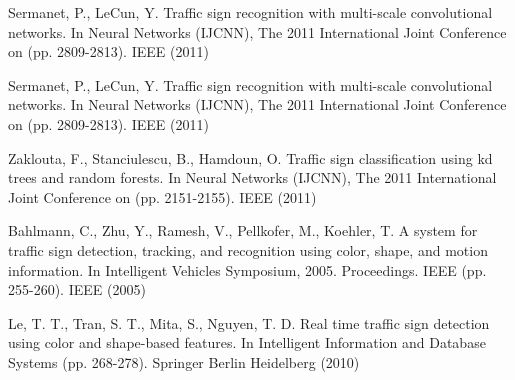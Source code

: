 \documentclass[conference]{IEEEtran}
\begin{document}
\begin{thebibliography}{1}
 Sermanet, P., LeCun, Y. Traffic sign recognition with multi-scale convolutional networks. In Neural Networks (IJCNN), The 2011 International Joint Conference on (pp. 2809-2813). IEEE (2011)

 Sermanet, P., LeCun, Y. Traffic sign recognition with multi-scale convolutional networks. In Neural Networks (IJCNN), The 2011 International Joint Conference on (pp. 2809-2813). IEEE (2011)

 Zaklouta, F., Stanciulescu, B., Hamdoun, O. Traffic sign classification using kd trees and random forests. In Neural Networks (IJCNN), The 2011 International Joint Conference on (pp. 2151-2155). IEEE (2011)

Bahlmann, C., Zhu, Y., Ramesh, V., Pellkofer, M., Koehler, T. A system for traffic sign detection, tracking, and recognition using color, shape, and motion information. In Intelligent Vehicles Symposium, 2005. Proceedings. IEEE (pp. 255-260). IEEE (2005)

Le, T. T., Tran, S. T., Mita, S., Nguyen, T. D. Real time traffic sign detection using color and shape-based features. In Intelligent Information and Database Systems (pp. 268-278). Springer Berlin Heidelberg (2010)

\end{thebibliography}
\end{document}
